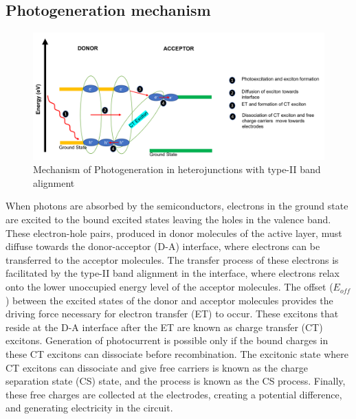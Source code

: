 \documentclass[12pt]{article}
\begin{document}
\subsection{Photogeneration mechanism}
\begin{figure}[H]
    \centering
    \includegraphics[scale = 0.6]{mechanism-CT.png}
    \caption{Mechanism of Photogeneration in heterojunctions with type-II band alignment}
    \label{fig:my_label}
\end{figure}
When photons are absorbed by the semiconductors, electrons in the ground state are excited to the bound excited states leaving the holes in the valence band. These electron-hole pairs, produced in donor molecules of the active layer, must diffuse towards the donor-acceptor (D-A) interface, where electrons can be transferred to the acceptor molecules. The transfer process of these electrons is facilitated by the type-II band alignment in the interface, where electrons relax onto the lower unoccupied energy level of the acceptor molecules. The offset ($E_{off}$) between the excited states of the donor and acceptor molecules provides the driving force necessary for electron transfer (ET) to occur. These excitons that reside at the D-A interface after the ET are known as charge transfer (CT) excitons. Generation of photocurrent is possible only if the bound charges in these CT excitons can dissociate before recombination. The excitonic state where CT excitons can dissociate and give free carriers is known as the charge separation state (CS) state, and the process is known as the CS process. Finally, these free charges are collected at the electrodes, creating a potential difference, and generating electricity in the circuit.
\end{document}
